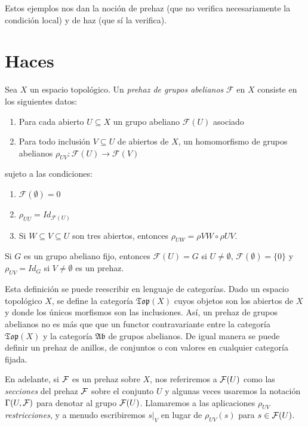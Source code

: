 \documentclass[GA.tex]{subfiles}
\begin{document}
Estos ejemplos nos dan la noción de prehaz (que no verifica necesariamente la condición local) y de haz (que sí la verifica).

\section{Haces}

\begin{defi}
Sea $X$ un espacio topológico. Un \emph{prehaz de grupos abelianos} $\mathcal{F}$ en $X$ consiste en los siguientes datos:
\begin{enumerate}
\item Para cada abierto $U\subseteq X$ un grupo abeliano $\mathcal{F}(U)$ asociado
\item Para todo inclusión $V\subseteq U$ de abiertos de $X$, un homomorfismo de grupos abelianos $\rho_{UV}:\mathcal{F}(U)\to\mathcal{F}(V)$
\end{enumerate}
sujeto a las condiciones:
\begin{enumerate}
\item $\mathcal{F}(\emptyset)=0$
\item $\rho_{UU}=Id_{\mathcal{F}(U)}$
\item Si $W\subseteq V\subseteq U$ son tres abiertos, entonces $\rho_{UW}=\rho{VW}\circ \rho{UV}$.
\end{enumerate}

\end{defi}

\begin{ej}
Si $G$  es un grupo abeliano fijo, entonces $\mathcal{F}(U)=G$ si $U\neq\emptyset$, $\mathcal{F}(\emptyset)=\{0\}$ y $\rho_{UV}=Id_G$ si $V\neq \emptyset$ es un prehaz.
\end{ej}

Esta definición se puede reescribir en lenguaje de categorías. Dado un espacio topológico $X$, se define la categoría $\mathfrak{Top}(X)$ cuyos objetos son los abiertos de $X$ y donde los únicos morfismos son las inclusiones. Así, un prehaz de grupos abelianos no es más que que un functor contravariante entre la categoría $\mathfrak{Top}(X)$ y la categoría $\mathfrak{Ab}$ de grupos abelianos. De igual manera se puede definir un prehaz de anillos, de conjuntos o con valores en cualquier categoría fijada.

En adelante, si $\mathcal{F}$ es un prehaz sobre $X$, nos referiremos a $\mathcal{F}(U)$ como las \emph{secciones} del prehaz $\mathcal{F}$ sobre el conjunto $U$ y algunas veces usaremos la notación $\Gamma(U,\mathcal{F})$ para denotar al grupo $\mathcal{F}(U)$. Llamaremos a las aplicaciones $\rho_{UV}$ \emph{restricciones}, y a menudo escribiremos $s|_V$ en lugar de $\rho_{UV}(s)$ para $s\in\mathcal{F}(U)$. 
\end{document}
